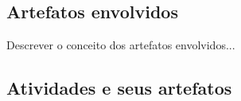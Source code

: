   
  \subsection{Artefatos envolvidos}
  
    Descrever o conceito dos artefatos envolvidos...
    
  \subsection{Atividades e seus artefatos}
    
    
    
    \pagebreak
    
    

    
    